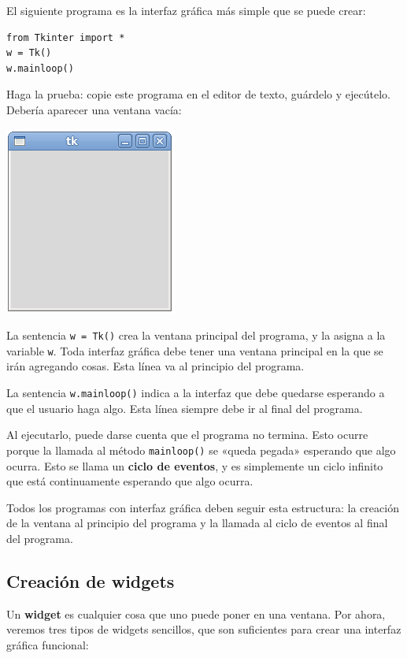 El siguiente programa es la interfaz gráfica más simple que se puede
crear:

\begin{lstlisting}
from Tkinter import *
w = Tk()
w.mainloop()
\end{lstlisting}

Haga la prueba: copie este programa en el editor de texto, guárdelo y
ejecútelo. Debería aparecer una ventana vacía:

\includegraphics{../diapos/programas/tkinter/capturas/01.png}

La sentencia \lstinline!w = Tk()! crea la ventana principal del
programa, y la asigna a la variable \lstinline!w!. Toda interfaz gráfica
debe tener una ventana principal en la que se irán agregando cosas. Esta
línea va al principio del programa.

La sentencia \lstinline!w.mainloop()! indica a la interfaz que debe
quedarse esperando a que el usuario haga algo. Esta línea siempre debe
ir al final del programa.

Al ejecutarlo, puede darse cuenta que el programa no termina. Esto
ocurre porque la llamada al método \lstinline!mainloop()! se «queda
pegada» esperando que algo ocurra. Esto se llama un \textbf{ciclo de
eventos}, y es simplemente un ciclo infinito que está continuamente
esperando que algo ocurra.

Todos los programas con interfaz gráfica deben seguir esta estructura:
la creación de la ventana al principio del programa y la llamada al
ciclo de eventos al final del programa.

\subsection{Creación de widgets}

Un \textbf{widget} es cualquier cosa que uno puede poner en una ventana.
Por ahora, veremos tres tipos de widgets sencillos, que son suficientes
para crear una interfaz gráfica funcional:

